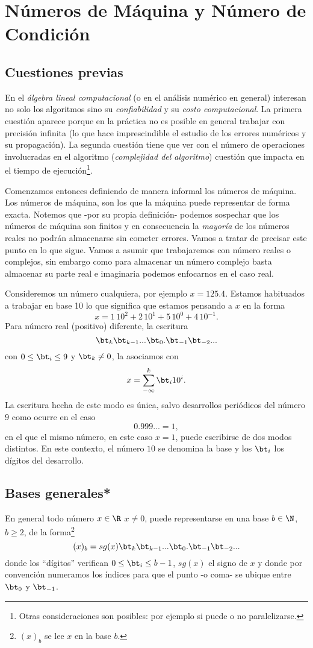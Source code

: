 \chapter{Números de Máquina y Número de Condición}
\setcounter{equation}{0}
\section{Cuestiones previas}

En el \emph{álgebra lineal computacional} (o en el análisis numérico en general) interesan no solo los algoritmos sino su \emph{confiabilidad}  y su \emph{costo computacional}. La primera cuestión aparece porque en la práctica no es posible en general trabajar con precisión infinita (lo que hace imprescindible el  estudio de los errores numéricos y su propagación). La segunda cuestión tiene que ver con el número de operaciones involucradas en el algoritmo (\emph{complejidad del algoritmo}) cuestión que impacta en el tiempo de ejecución\footnote{Otras consideraciones son posibles: por ejemplo si puede o no paralelizarse.}.

Comenzamos entonces definiendo de manera informal los números de máquina.
\tcc
Los números de máquina, son los que la máquina puede representar de forma exacta. 
\etcc
Notemos que -por su propia definición- podemos sospechar que los números de máquina son finitos y en consecuencia la \emph{mayoría} de los números reales no podrán almacenarse sin cometer errores. Vamos a tratar de precisar este punto en lo que sigue. Vamos a asumir que trabajaremos con número reales o complejos, sin embargo como para almacenar un número complejo basta almacenar su parte real e imaginaria podemos enfocarnos en el caso real.

Consideremos un número cualquiera, por ejemplo $x=125.4$. Estamos habituados a trabajar en base 10 lo que significa que estamos pensando a $x$ en la forma
$$
x=1\,10^2+2\,10^1+5\,10^0+4\,10^{-1}.
$$
Para número real (positivo) diferente, la escritura   
$$
\bt_k\bt_{k-1}...\bt_0.\bt_{-1}\bt_{-2}...
$$
con $0\le \bt_i\le 9$ y $\bt_k\neq 0$, la asociamos con 
$$
x=\sum_{-\infty}^k \bt_{i}10^{i}.
$$
La escritura hecha de este modo es \'unica, salvo desarrollos periódicos del número $9$ como ocurre en el caso
$$
0.999...=1,
$$ 
en el que el mismo número, en este caso $x=1$, puede escribirse de dos modos distintos.
En este contexto, el número $10$ se denomina la base y los $\bt_i$ los dígitos del desarrollo.
\section{Bases generales*} 
En general todo número  $x\in \R$ $x\neq 0$, puede representarse en una base $b\in\N$, $b\ge 2$, de la forma\footnote{$(x)_b$ se lee $x$ en la base $b$.}
\begin{equation}
 \label{eq:represbaseb}
(x)_b=sg(x)\bt_k\bt_{k-1}...\bt_0.\bt_{-1}\bt_{-2}...
 \end{equation}
donde los ``dígitos'' verifican $0\le \bt_i\le b-1$, $sg(x)$ el signo de $x$ y donde por convención numeramos los índices para que el punto -o coma- se ubique entre $\bt_0$ y $\bt_{-1}$.

